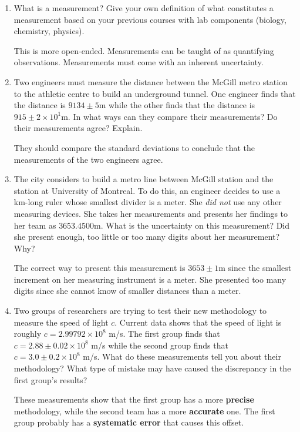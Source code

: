 \documentclass[12pt]{report}
\begin{document}
\begin{enumerate}
\item What is a measurement? Give your own definition of what constitutes a measurement based on your previous courses with lab components (biology, chemistry, physics).
\begin{tcolorbox}[title=Answer]
This is more open-ended. Measurements can be taught of as quantifying observations. Measurements must come with an inherent uncertainty.
\end{tcolorbox}
\item Two engineers must measure the distance between the McGill metro station to the athletic centre to build an underground tunnel. One engineer finds that the distance is $9134 \pm 5$m while the other finds that the distance is $915 \pm 2 \times 10^1$m. In what ways can they compare their measurements? Do their measurements agree? Explain.
\begin{tcolorbox}[title=Answer]
They should compare the standard deviations to conclude that the measurements of the two engineers agree.
\end{tcolorbox}
\item The city considers to build a metro line between McGill station and the station at University of Montreal. To do this, an engineer decides to use a km-long ruler whose smallest divider is a meter. She \textit{did not} use any other measuring devices. She takes her measurements and presents her findings to her team as $3653.4500$m. What is the uncertainty on this measurement? Did she present enough, too little or too many digits about her measurement? Why?
\begin{tcolorbox}[title=Answer]
The correct way to present this measurement is $3653 \pm 1$m since the smallest increment on her measuring instrument is a meter. She presented too many digits since she cannot know of smaller distances than a meter.
\end{tcolorbox}
\item Two groups of researchers are trying to test their new methodology to measure the speed of light $c$. Current data shows that the speed of light is roughly $c=2.99 792 \times 10^8$ m/s. The first group finds that $c=2.88 \pm 0.02 \times 10^8$ m/s while the second group finds that $c=3.0 \pm 0.2 \times 10^8$ m/s. What do these measurements tell you about their methodology? What type of mistake may have caused the discrepancy in the first group's results?
\begin{tcolorbox}[title=Answer]
These measurements show that the first group has a more \textbf{precise} methodology, while the second team has a more \textbf{accurate} one. The first group probably has a \textbf{systematic error} that causes this offset.

\end{tcolorbox}
\end{enumerate}
\end{document}
